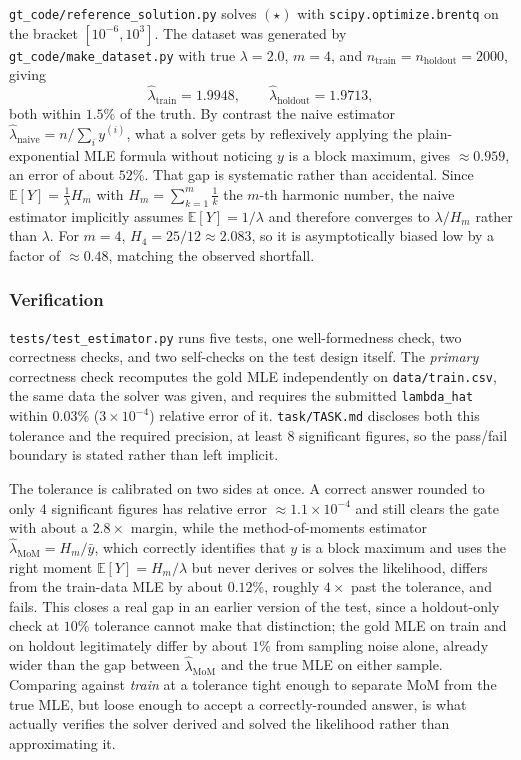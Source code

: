\documentclass[11pt]{article}
\begin{document}
\texttt{gt\_code/reference\_solution.py} solves $(\star)$ with
\texttt{scipy.optimize.brentq} on the bracket $[10^{-6}, 10^3]$. The dataset was
generated by \texttt{gt\_code/make\_dataset.py} with true $\lambda=2.0$, $m=4$,
and $n_{\text{train}}=n_{\text{holdout}}=2000$, giving
\[
  \hat\lambda_{\text{train}} = 1.9948, \qquad \hat\lambda_{\text{holdout}} = 1.9713,
\]
both within $1.5\%$ of the truth. By contrast the naive estimator
$\hat\lambda_{\text{naive}} = n/\sum_i y^{(i)}$, what a solver gets by
reflexively applying the plain-exponential MLE formula without noticing $y$ is a
block maximum, gives $\approx 0.959$, an error of about $52\%$. That gap is
systematic rather than accidental. Since $\mathbb{E}[Y] = \frac{1}{\lambda}H_m$
with $H_m=\sum_{k=1}^m \frac1k$ the $m$-th harmonic number, the naive estimator
implicitly assumes $\mathbb{E}[Y]=1/\lambda$ and therefore converges to
$\lambda/H_m$ rather than $\lambda$. For $m=4$, $H_4 = 25/12 \approx 2.083$, so
it is asymptotically biased low by a factor of $\approx 0.48$, matching the
observed shortfall.

\subsubsection*{Verification}

\texttt{tests/test\_estimator.py} runs five tests, one well-formedness check,
two correctness checks, and two self-checks on the test design itself. The
\emph{primary} correctness check recomputes the gold MLE independently on
\texttt{data/train.csv}, the same data the solver was given, and requires the
submitted \texttt{lambda\_hat} within $0.03\%$ ($3\times10^{-4}$) relative error
of it. \texttt{task/TASK.md} discloses both this tolerance and the required
precision, at least $8$ significant figures, so the pass/fail boundary is
stated rather than left implicit.

The tolerance is calibrated on two sides at once. A correct answer rounded to
only $4$ significant figures has relative error $\approx 1.1\times10^{-4}$ and
still clears the gate with about a $2.8\times$ margin, while the
method-of-moments estimator $\hat\lambda_{\text{MoM}} = H_m/\bar y$, which
correctly identifies that $y$ is a block maximum and uses the right moment
$\mathbb{E}[Y]=H_m/\lambda$ but never derives or solves the likelihood, differs
from the train-data MLE by about $0.12\%$, roughly $4\times$ past the tolerance,
and fails. This closes a real gap in an earlier version of the test, since a
holdout-only check at $10\%$ tolerance cannot make that distinction; the gold
MLE on train and on holdout legitimately differ by about $1\%$ from sampling
noise alone, already wider than the gap between $\hat\lambda_{\text{MoM}}$ and
the true MLE on either sample. Comparing against \emph{train} at a tolerance
tight enough to separate MoM from the true MLE, but loose enough to accept a
correctly-rounded answer, is what actually verifies the solver derived and
solved the likelihood rather than approximating it.
\end{document}
